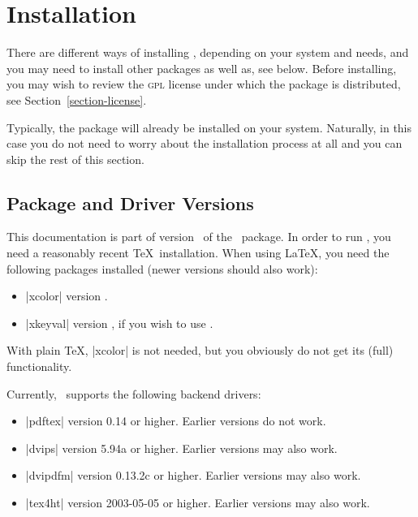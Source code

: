 %


\section{Installation}

There are different ways of installing \pgfname, depending
on your system and needs, and you may need to install other
packages as well as, see below. Before installing, you may wish to
review the \textsc{gpl} license under which the package is
distributed, see Section~\ref{section-license}. 

Typically, the package will already be installed on your
system. Naturally, in this case you do not need to worry about the
installation process at all and you can skip the rest of this
section. 


\subsection{Package and Driver Versions}

This documentation is part of version \pgfversion\ of the \pgfname\
package. In order to run \pgfname, you need a reasonably recent 
\TeX\ installation. When using \LaTeX, you need the following packages
installed (newer versions should also work):
\begin{itemize}
\item
  |xcolor| version \xcolorversion.
\item
  |xkeyval| version \xkeyvalversion, if you wish to use \tikzname.
\end{itemize}
With plain \TeX, |xcolor| is not needed, but you obviously do not
get its (full) functionality. 

Currently, \pgfname\ supports the following backend drivers:
\begin{itemize}
\item
  |pdftex| version 0.14 or higher. Earlier versions do not work.
\item
  |dvips| version 5.94a or higher. Earlier versions may also work.
\item
  |dvipdfm| version 0.13.2c or higher. Earlier versions may also work.
\item
  |tex4ht| version 2003-05-05 or higher. Earlier versions may also work.
\end{itemize}

